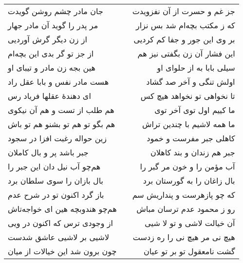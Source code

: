 \begin{center}
\begin{longtable}{l p{0.5cm} r}
\\
جان مادر چشم روشن گویدت
&&
جز غم و حسرت از آن نفزویدت
\\
مر پدر را گوید آن مادر جهار
&&
که ز مکتب بچه‌ام شد بس نزار
\\
از زن دیگر گرش آوردیی
&&
بر وی این جور و جفا کم کردیی
\\
از جز تو گر بدی این بچه‌ام
&&
این فشار آن زن بگفتی نیز هم
\\
هین بجه زن مادر و تیبای او
&&
سیلی بابا به از حلوای او
\\
هست مادر نفس و بابا عقل راد
&&
اولش تنگی و آخر صد گشاد
\\
ای دهندهٔ عقلها فریاد رس
&&
تا نخواهی تو نخواهد هیچ کس
\\
هم طلب از تست و هم آن نیکوی
&&
ما کییم اول توی آخر توی
\\
هم بگو تو هم تو بشنو هم تو باش
&&
ما همه لاشیم با چندین تراش
\\
زین حواله رغبت افزا در سجود
&&
کاهلی جبر مفرست و خمود
\\
جبر باشد پر و بال کاملان
&&
جبر هم زندان و بند کاهلان
\\
هم‌چو آب نیل دان این جبر را
&&
آب مؤمن را و خون مر گبر را
\\
بال بازان را سوی سلطان برد
&&
بال زاغان را به گورستان برد
\\
باز گرد اکنون تو در شرح عدم
&&
که چو پازهرست و پنداریش سم
\\
هم‌چو هندوبچه هین ای خواجه‌تاش
&&
رو ز محمود عدم ترسان مباش
\\
از وجودی ترس که اکنون در ویی
&&
آن خیالت لاشی و تو لا شیی
\\
لاشیی بر لاشیی عاشق شدست
&&
هیچ نی مر هیچ نی را ره زدست
\\
چون برون شد این خیالات از میان
&&
گشت نامعقول تو بر تو عیان
\\
\end{longtable}
\end{center}
